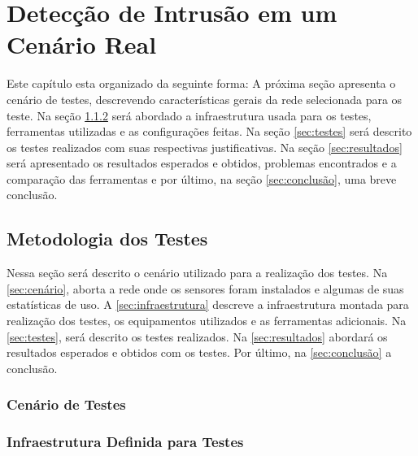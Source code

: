 \chapter{Detecção de Intrusão em um Cenário Real} \label{ch:cenário-real}

Este capítulo esta organizado da seguinte forma: A próxima seção apresenta o cenário de testes, descrevendo características gerais da rede selecionada para os teste. Na seção \ref{sec:infraestrutura} será abordado a infraestrutura usada para os testes, ferramentas utilizadas e as configurações feitas. Na seção \ref{sec:testes} será descrito os testes realizados com suas respectivas justificativas. Na seção \ref{sec:resultados} será apresentado os resultados esperados e obtidos, problemas encontrados e a comparação das ferramentas e por último, na seção \ref{sec:conclusão}, uma breve conclusão.

\section{Metodologia dos Testes}

Nessa seção será descrito o cenário utilizado para a realização dos testes. Na \autoref{sec:cenário}, aborta a rede onde os sensores foram instalados e algumas de suas estatísticas de uso. A \autoref{sec:infraestrutura} descreve a infraestrutura montada para realização dos testes, os equipamentos utilizados e as ferramentas adicionais. Na \autoref{sec:testes}, será descrito os testes realizados. Na \autoref{sec:resultados} abordará os resultados esperados e obtidos com os testes. Por último, na \autoref{sec:conclusão} a conclusão.

\subsection{Cenário de Testes} \label{sec:cenário}

\subsection{Infraestrutura Definida para Testes} \label{sec:infraestrutura}

